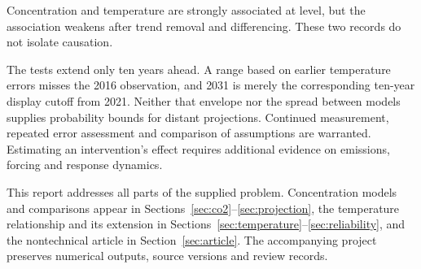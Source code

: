 \documentclass[11pt,a4paper]{article}
\newcommand{\p}[2]{#2\par}
\begin{document}
\p{SUM06}{Concentration and temperature are strongly associated at level, but the association weakens after trend removal and differencing. These two records do not isolate causation.}
\p{SUM05}{The tests extend only ten years ahead. A range based on earlier temperature errors misses the 2016 observation, and 2031 is merely the corresponding ten-year display cutoff from 2021. Neither that envelope nor the spread between models supplies probability bounds for distant projections. Continued measurement, repeated error assessment and comparison of assumptions are warranted. Estimating an intervention's effect requires additional evidence on emissions, forcing and response dynamics.}
\clearpage
\tableofcontents
\vfill
\p{CONT01}{This report addresses all parts of the supplied problem. Concentration models and comparisons appear in Sections~\ref{sec:co2}--\ref{sec:projection}, the temperature relationship and its extension in Sections~\ref{sec:temperature}--\ref{sec:reliability}, and the nontechnical article in Section~\ref{sec:article}. The accompanying project preserves numerical outputs, source versions and review records.}
\clearpage
\end{document}

